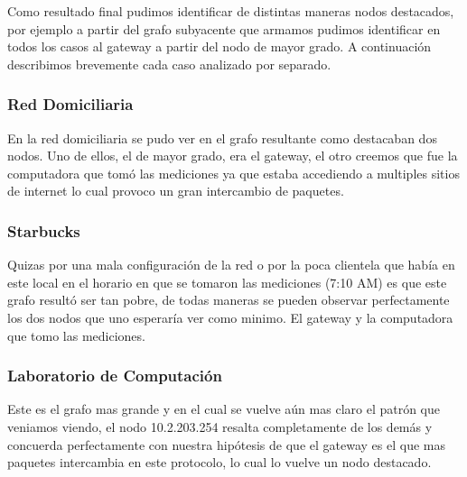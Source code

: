 
Como resultado final pudimos identificar de distintas maneras nodos destacados, por ejemplo a partir del grafo subyacente que armamos pudimos identificar en todos los casos al gateway a partir del nodo de mayor grado. A continuación describimos brevemente cada caso analizado por separado.

\subsubsection{Red Domiciliaria}

En la red domiciliaria se pudo ver en el grafo resultante como destacaban dos nodos. Uno de ellos, el de mayor grado, era el gateway, el otro creemos que fue la computadora que tomó las mediciones ya que estaba accediendo a multiples sitios de internet lo cual provoco un gran intercambio de paquetes.

\subsubsection{Starbucks}

Quizas por una mala configuración de la red o por la poca clientela que había en este local en el horario en que se tomaron las mediciones (7:10 AM) es que este grafo resultó ser tan pobre, de todas maneras se pueden observar perfectamente los dos nodos que uno esperaría ver como minimo. El gateway y la computadora que tomo las mediciones.

\subsubsection{Laboratorio de Computación}

Este es el grafo mas grande y en el cual se vuelve aún mas claro el patrón que veniamos viendo, el nodo 10.2.203.254 resalta completamente de los demás y concuerda perfectamente con nuestra hipótesis de que el gateway es el que mas paquetes intercambia en este protocolo, lo cual lo vuelve un nodo destacado.